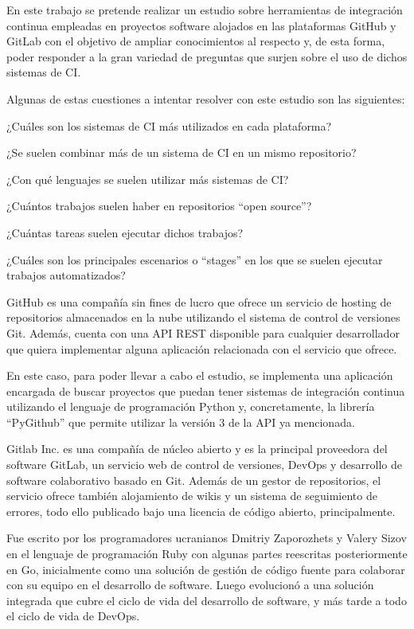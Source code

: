 En este trabajo se pretende realizar un estudio sobre herramientas de integración continua empleadas en proyectos software alojados en las plataformas GitHub y GitLab con el objetivo de ampliar conocimientos al respecto y, de esta forma, poder responder a la gran variedad de preguntas que surjen sobre el uso de dichos sistemas de CI.

Algunas de estas cuestiones a intentar resolver con este estudio son las siguientes:
\begin{compactitem}
    \item ¿Cuáles son los sistemas de CI más utilizados en cada plataforma?
    \item ¿Se suelen combinar más de un sistema de CI en un mismo repositorio?
    \item ¿Con qué lenguajes se suelen utilizar más sistemas de CI?
    \item ¿Cuántos trabajos suelen haber en repositorios ``open source''?
    \item ¿Cuántas tareas suelen ejecutar dichos trabajos?
    \item ¿Cuáles son los principales escenarios o ``stages'' en los que se suelen ejecutar trabajos automatizados?
\end{compactitem}

GitHub es una compañía sin fines de lucro que ofrece un servicio de hosting de repositorios almacenados en la nube utilizando el sistema de control de versiones Git. 
Además, cuenta con una API REST disponible para cualquier desarrollador que quiera implementar alguna aplicación relacionada con el servicio que ofrece. 

En este caso, para poder llevar a cabo el estudio, se implementa una aplicación encargada de buscar proyectos que puedan tener sistemas de integración continua utilizando el lenguaje de programación Python y, concretamente, la librería “PyGithub” que permite utilizar la versión 3 de la API ya mencionada.

Gitlab Inc. es una compañía de núcleo abierto y es la principal proveedora del software GitLab, un servicio web de control de versiones, DevOps y desarrollo de software colaborativo basado en Git. Además de un gestor de repositorios, el servicio ofrece también alojamiento de wikis y un sistema de seguimiento de errores, todo ello publicado bajo una licencia de código abierto, principalmente.

Fue escrito por los programadores ucranianos Dmitriy Zaporozhets y Valery Sizov en el lenguaje de programación Ruby con algunas partes reescritas posteriormente en Go, inicialmente como una solución de gestión de código fuente para colaborar con su equipo en el desarrollo de software. Luego evolucionó a una solución integrada que cubre el ciclo de vida del desarrollo de software, y más tarde a todo el ciclo de vida de DevOps. 

